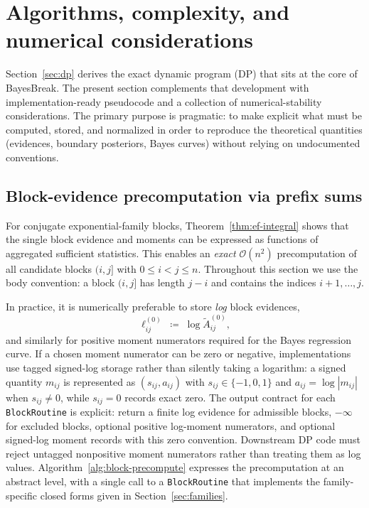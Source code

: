 \section{Algorithms, complexity, and numerical considerations}
\label{sec:algorithms}

Section~\ref{sec:dp} derives the exact dynamic program (DP) that sits at the core of BayesBreak.
The present section complements that development with implementation-ready pseudocode and a
collection of numerical-stability considerations.
The primary purpose is pragmatic: to make explicit what must be computed, stored, and
normalized in order to reproduce the theoretical quantities (evidences, boundary posteriors,
Bayes curves) without relying on undocumented conventions.

\subsection{Block-evidence precomputation via prefix sums}
\label{sec:alg-blocks}

For conjugate exponential-family blocks, Theorem~\ref{thm:ef-integral} shows that the single
block evidence and moments can be expressed as functions of aggregated sufficient statistics.
This enables an \emph{exact} $\mathcal{O}(n^2)$ precomputation of all candidate blocks $(i,j]$
with $0\le i<j\le n$. Throughout this section we use the body convention: a block $(i,j]$ has
length $j-i$ and contains the indices $i+1,\dots,j$.

In practice, it is numerically preferable to store \emph{log} block evidences,
\begin{equation}
    \ell_{i j}^{(0)} \;\coloneqq\; \log \widetilde{A}^{(0)}_{i j},
\end{equation}
and similarly for positive moment numerators required for the Bayes regression curve. If a chosen
moment numerator can be zero or negative, implementations use tagged signed-log storage rather than
silently taking a logarithm: a signed quantity $m_{ij}$ is represented as $(s_{ij},a_{ij})$ with
$s_{ij}\in\{-1,0,1\}$ and $a_{ij}=\log |m_{ij}|$ when $s_{ij}\ne0$, while $s_{ij}=0$ records exact
zero. The output contract for each \texttt{BlockRoutine} is explicit: return a finite log evidence
for admissible blocks, $-\infty$ for excluded blocks, optional positive log-moment numerators, and
optional signed-log moment records with this zero convention. Downstream DP code must reject
untagged nonpositive moment numerators rather than treating them as log values. Algorithm~\ref{alg:block-precompute} expresses the precomputation at an abstract level, with a
single call to a \texttt{BlockRoutine} that implements the family-specific closed forms given in
Section~\ref{sec:families}.

